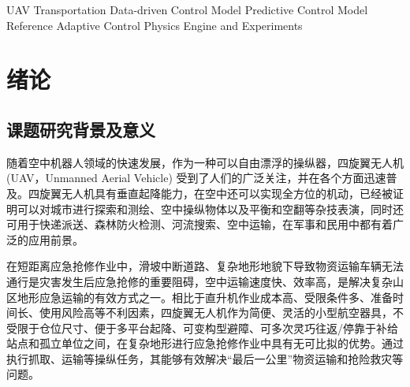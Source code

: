 \documentclass[lang=chs, degree=master, blindreview=false, winfonts=true]{yanputhesis}
\begin{document}
\begin{engabstract}
   
   
    \begin{engkeywords}                                     %
        UAV Transportation \ensep Data-driven Control \ensep Model Predictive Control \ensep Model Reference Adaptive Control \ensep Physics Engine and Experiments         %
    \end{engkeywords}                                       %
\end{engabstract}                                           %
\tableofcontents                                            %
\mainmatter
\sDefault

\chapter{绪论}
\section{课题研究背景及意义}
随着空中机器人领域的快速发展，作为一种可以自由漂浮的操纵器，四旋翼无人机(UAV，Unmanned Aerial Vehicle) 受到了人们的广泛关注，并在各个方面迅速普及\cite{kimon_advances_2023}。四旋翼无人机具有垂直起降能力，在空中还可以实现全方位的机动，已经被证明可以对城市进行探索和测绘\cite{tomic2012toward}、空中操纵物体\cite{suarez2020benchmarks}以及平衡和空翻等杂技表演\cite{beul2018fast}，同时还可用于快递派送\cite{刘昂2020基于}、森林防火检测\cite{harikumar2018multi}、河流搜索\cite{nuske2015autonomous}、空中运输\cite{klausen2018cooperative}，在军事和民用中都有着广泛的应用前景。

在短距离应急抢修作业中，滑坡中断道路、复杂地形地貌下导致物资运输车辆无法通行是灾害发生后应急抢修的重要阻碍，空中运输速度快、效率高，是解决复杂山区地形应急运输的有效方式之一。相比于直升机作业成本高、受限条件多、准备时间长、使用风险高等不利因素，四旋翼无人机作为简便、灵活的小型航空器具，不受限于仓位尺寸、便于多平台起降、可变构型避障、可多次灵巧往返/停靠于补给站点和孤立单位之间，在复杂地形进行应急抢修作业中具有无可比拟的优势。通过执行抓取、运输等操纵任务，其能够有效解决“最后一公里”物资运输和抢险救灾等问题。
\end{document}
